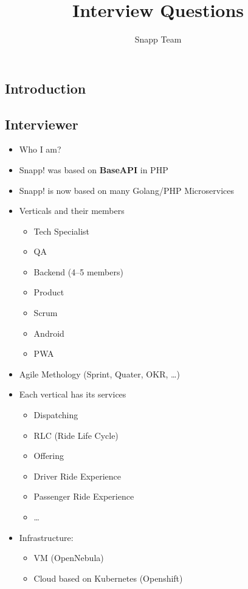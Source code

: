 \documentclass[]{article}
\begin{document}
\title{Interview Questions}
\author{Snapp Team}

\maketitle

\begin{multicols}{2}

  \section{Introduction}

  \subsection{Interviewer}
  \begin{itemize}
    \item Who I am?
    \item Snapp! was based on \textbf{BaseAPI} in PHP
    \item Snapp! is now based on many Golang/PHP Microservices
    \item Verticals and their members
      \begin{itemize}
        \item Tech Specialist
        \item QA
        \item Backend (4--5 members)
        \item Product
        \item Scrum
        \item Android
        \item PWA
      \end{itemize}
    \item Agile Methology (Sprint, Quater, OKR, \ldots)
    \item Each vertical has its services
      \begin{itemize}
        \item Dispatching
        \item RLC (Ride Life Cycle)
        \item Offering
        \item Driver Ride Experience
        \item Passenger Ride Experience
        \item \ldots
      \end{itemize}
    \item Infrastructure:
      \begin{itemize}
        \item VM (OpenNebula)
        \item Cloud based on Kubernetes (Openshift)
      \end{itemize}
  \end{itemize}


\end{multicols}
\end{document}
